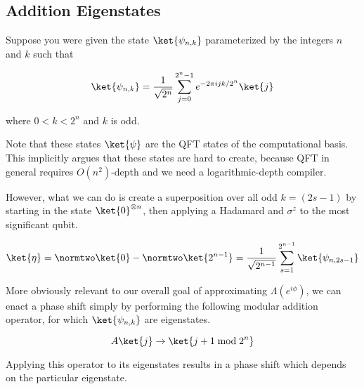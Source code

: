 \subsection{Addition Eigenstates}
\label{subsec:magic-state}

Suppose you were given the state $\ket{\psi_{n,k}}$
parameterized by the
integers $n$ and $k$ such that

\begin{equation}
\ket{\psi_{n,k}} = \frac{1}{\sqrt{2^n}} \sum_{j=0}^{2^n-1}
e^{-2\pi i j k / 2^n} \ket{j}
\end{equation}

where $0 < k < 2^n$ and $k$ is odd.

Note that these states $\ket{\psi}$ are the
QFT states of the computational basis.
This implicitly argues that these states are hard to create,
because QFT in general requires
$O(n^2)$-depth and we need a logarithmic-depth compiler.

However, what we can do is create a superposition over all odd $k=(2s-1)$
by starting in the state $\ket{0}^{\otimes n}$,
then applying a Hadamard and $\sigma^z$ to the most significant qubit.

\begin{equation}
\ket{\eta} = \normtwo \ket{0} - \normtwo \ket{2^{n-1}} =
\frac{1}{\sqrt{2^{n-1}}} \sum_{s=1}^{2^{n-1}} \ket{\psi_{n,2s-1}}
\end{equation}

More obviously relevant to our overall goal of approximating
$\Lambda(e^{i\phi})$, we can enact a phase
shift simply by performing the following modular addition operator, for
which $\ket{\psi_{n,k}}$ are eigenstates.

\begin{equation}
A\ket{j} \rightarrow \ket{j+1 \bmod 2^n}
\end{equation}

Applying this operator to its eigenstates results in a phase shift which
depends on the particular eigenstate.
 
